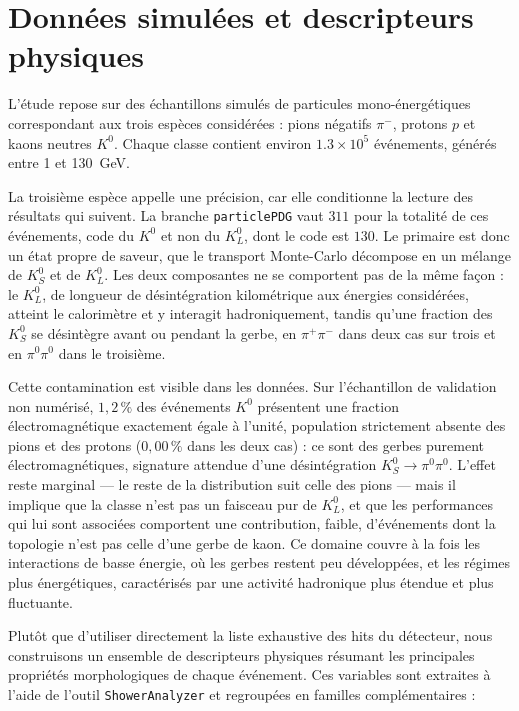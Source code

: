 \section{Données simulées et descripteurs physiques}
\label{sec:pid-donnees}

L'étude repose sur des échantillons simulés de particules mono-énergétiques correspondant aux trois espèces considérées : pions négatifs \(\pi^-\), protons \(p\) et kaons neutres \(K^0\). Chaque classe contient environ \(1.3\times10^{5}\) événements, générés entre 1 et 130~GeV.

La troisième espèce appelle une précision, car elle conditionne la lecture des résultats qui suivent. La branche \texttt{particlePDG} vaut \(311\) pour la totalité de ces événements, code du \(K^0\) et non du \(K^0_L\), dont le code est \(130\). Le primaire est donc un état propre de saveur, que le transport Monte-Carlo décompose en un mélange de \(K^0_S\) et de \(K^0_L\). Les deux composantes ne se comportent pas de la même façon : le \(K^0_L\), de longueur de désintégration kilométrique aux énergies considérées, atteint le calorimètre et y interagit hadroniquement, tandis qu'une fraction des \(K^0_S\) se désintègre avant ou pendant la gerbe, en \(\pi^+\pi^-\) dans deux cas sur trois et en \(\pi^0\pi^0\) dans le troisième.

Cette contamination est visible dans les données. Sur l'échantillon de validation non numérisé, \(1{,}2\,\%\) des événements \(K^0\) présentent une fraction électromagnétique exactement égale à l'unité, population strictement absente des pions et des protons (\(0{,}00\,\%\) dans les deux cas) : ce sont des gerbes purement électromagnétiques, signature attendue d'une désintégration \(K^0_S \to \pi^0\pi^0\). L'effet reste marginal — le reste de la distribution suit celle des pions — mais il implique que la classe n'est pas un faisceau pur de \(K^0_L\), et que les performances qui lui sont associées comportent une contribution, faible, d'événements dont la topologie n'est pas celle d'une gerbe de kaon. Ce domaine couvre à la fois les interactions de basse énergie, où les gerbes restent peu développées, et les régimes plus énergétiques, caractérisés par une activité hadronique plus étendue et plus fluctuante.

Plutôt que d'utiliser directement la liste exhaustive des hits du détecteur, nous construisons un ensemble de descripteurs physiques résumant les principales propriétés morphologiques de chaque événement. Ces variables sont extraites à l'aide de l'outil \texttt{ShowerAnalyzer} et regroupées en familles complémentaires :

